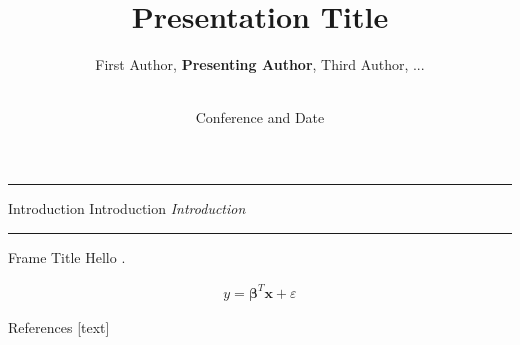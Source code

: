 \documentclass[10pt]{beamer} %
\author{
    First Author,
    \textbf{Presenting Author},
    Third Author, ...}
\title{
    Presentation Title}
\institute{Technical University of Denmark}
\date{\\[\bigskipamount]Conference and Date}
\renewcommand{\vec}[1]{\bm{#1}}
\newcommand{\transframe}[1]{
    \begin{frame}[c]{}
        \begin{center}
        \hrule \vskip 15pt
        \huge #1
        \vskip 15pt \hrule
        \end{center}
    \end{frame}
}
\begin{document}
\begin{frame}[t,plain]
\titlepage
\end{frame}

\transframe{Introduction Introduction \emph{Introduction}}

\begin{frame}[t]{Frame Title}
Hello \cite{dummycite}.

\begin{align}
		y = \vec{\beta}^T \vec{x} + \varepsilon
\end{align}
\end{frame}

\begin{frame}[t]{References}  %
    [text]
    \renewcommand*{\bibfont}{\small}
    \printbibliography
\end{frame}
\end{document}
